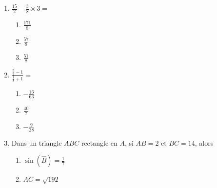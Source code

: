 \documentclass[oneside,twoside]{book}
\begin{document}
\begin{enumerate}
\begin{enumerate}
\item\BonneReponse $\{4 ;-8\}$

\item\MauvaiseReponse $\{4 ; 8\}$

\end{enumerate}


















\item $\frac{15}{2} - \frac{3}{8} \times3=$

\begin{enumerate}

\item\MauvaiseReponse $\frac{171}{8}$

\item\MauvaiseReponse $\frac{57}{8}$

\item\BonneReponse $\frac{51}{8}$

\end{enumerate}



\item $\displaystyle\frac{\frac{5}{7}-1}{\frac{1}{8}+1}=$

\begin{enumerate}

\item\BonneReponse $-\frac{16}{63}$

\item\MauvaiseReponse $\frac{40}{7}$

\item\MauvaiseReponse $-\frac{9}{28}$

\end{enumerate}



\item Dans un triangle $ABC$ rectangle en $A$, si $AB=2$ et $BC=14$, alors

\begin{enumerate}

\item\MauvaiseReponse $\sin (\hat{B})=\frac{1}{7}$

\item\BonneReponse $AC=\sqrt{192}$


\end{enumerate}
\end{enumerate}
\end{document}
